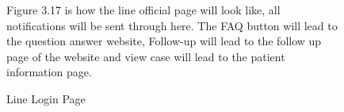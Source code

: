 \documentclass[12pt,oneside,openright,a4paper]{cpe-english-project}
\begin{document}
\begin{figure}[!h]
\begin{minipage}{.3\textwidth}
        \centering
      \end{minipage}%
    
      \caption{Line Login Page}\label{fig:Line Login Page}
      \begin{flushleft}
        \qquad Figure 3.17 is how the line official page will look like, all notifications will be sent through here. The FAQ button will lead to the question answer website, Follow-up will lead to the follow up page of the website and view case will lead to the patient information page. \par
      \end{flushleft}
    \end{figure}
\end{document}
